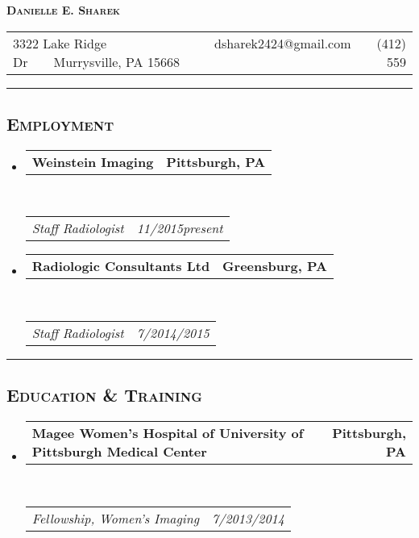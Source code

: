 \documentclass[12pt,letterpaper,oneside]{article}
\makeatletter
\newcommand{\headerrow}[2]
{\begin{tabular*}{\linewidth}{l@{\extracolsep{\fill}}r}
	#1 &
	#2 \\
\end{tabular*}}
\makeatother
\begin{document}
\begin{center}
{\LARGE \textbf{\textsc{Danielle E. Sharek}}}
\vspace{4mm}

\headerrow
	{3322 Lake Ridge Dr\ \ \textbullet \ \ Murrysville, PA 15668}
	{dsharek2424@gmail.com\ \ \textbullet \ \ (412) 559\textendash 8747}	
\end{center}
\vspace{-2mm}

\hrule
\vspace{-0.4em}
\subsection*{\centering\textsc{Employment}}

\begin{itemize}
	\parskip=0.1em

	\item 
	\headerrow
		{\textbf{Weinstein Imaging}}
		{\textbf{Pittsburgh, PA}}
	\\
	\headerrow
		{\emph{Staff Radiologist}}
		{\emph{11/2015\textendash present}}
	\vspace{-6mm}

	\item 
	\headerrow
		{\textbf{Radiologic Consultants Ltd}}
		{\textbf{Greensburg, PA}}
	\\
	\headerrow
		{\emph{Staff Radiologist}}
		{\emph{7/2014\textendash 10/2015}}
	\vspace{-6mm}
\end{itemize}
	\vspace{3mm}
\hrule
\vspace{-0.4em}
\subsection*{\centering\textsc{Education \& Training}}

\begin{itemize}
	\parskip=0.1em

	\item 
	\headerrow
		{\textbf{Magee Women's Hospital of University of Pittsburgh Medical Center}}
		{\textbf{Pittsburgh, PA}}
	\\
	\headerrow
		{\emph{Fellowship, Women's Imaging}}
		{\emph{7/2013\textendash 6/2014}}
	\vspace{-6mm}
\end{itemize}
\end{document}
